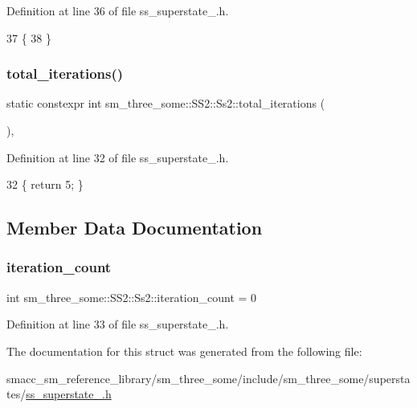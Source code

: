 Definition at line 36 of file ss\+\_\+superstate\+\_.\+h.


\begin{DoxyCode}
37     \{
38     \}
\end{DoxyCode}
\mbox{\label{structsm__three__some_1_1SS2_1_1Ss2_a40a682abb6bcacffdc2886c531aa8e10}} 
\subsubsection{\texorpdfstring{total\+\_\+iterations()}{total\_iterations()}}
{\footnotesize\ttfamily static constexpr int sm\+\_\+three\+\_\+some\+::\+S\+S2\+::\+Ss2\+::total\+\_\+iterations (\begin{DoxyParamCaption}{ }\end{DoxyParamCaption})\hspace{0.3cm}{\ttfamily [inline]}, {\ttfamily [static]}}



Definition at line 32 of file ss\+\_\+superstate\+\_.\+h.


\begin{DoxyCode}
32 \{ \textcolor{keywordflow}{return} 5; \}
\end{DoxyCode}


\subsection{Member Data Documentation}
\mbox{\label{structsm__three__some_1_1SS2_1_1Ss2_ad0f43df403bcb029afb07a0f52699c60}} 
\subsubsection{\texorpdfstring{iteration\+\_\+count}{iteration\_count}}
{\footnotesize\ttfamily int sm\+\_\+three\+\_\+some\+::\+S\+S2\+::\+Ss2\+::iteration\+\_\+count = 0}



Definition at line 33 of file ss\+\_\+superstate\+\_.\+h.



The documentation for this struct was generated from the following file\+:\begin{DoxyCompactItemize}
\item 
smacc\+\_\+sm\+\_\+reference\+\_\+library/sm\+\_\+three\+\_\+some/include/sm\+\_\+three\+\_\+some/superstates/\hyperlink{ss__superstate__2_8h}{ss\+\_\+superstate\+\_.\+h}\end{DoxyCompactItemize}
